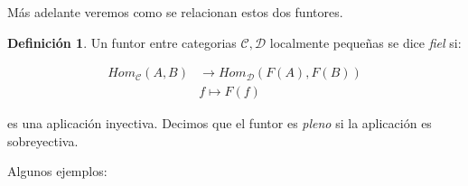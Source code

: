 \documentclass{article}
\theoremstyle{plain}
\theoremstyle{definition}
\newtheorem{definition}[theorem]{Definición}
\theoremstyle{remark}
\begin{document}
Más adelante veremos como se relacionan estos dos funtores. \\

\begin{definition}
    Un funtor entre categorias $\mathcal{C}, \mathcal{D}$ localmente pequeñas se dice \textit{fiel} si:

    \begin{align*}
         Hom_{\mathcal{C}}(A,B) & \to Hom_{\mathcal{D}}(F(A),F(B)) \\
        & f \longmapsto F(f)
    \end{align*}

    es una aplicación inyectiva. Decimos que el funtor es \textit{pleno} si la aplicación es sobreyectiva.
\end{definition}


Algunos ejemplos:
\end{document}
